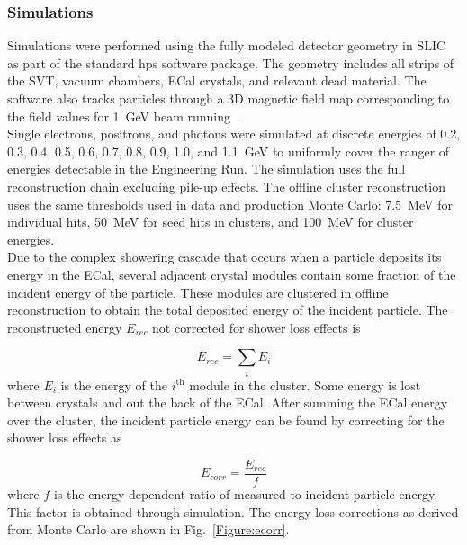 \subsubsection{Simulations}
Simulations were performed using the fully modeled detector geometry in SLIC as part of the standard hps software package. The geometry includes all strips of the SVT, vacuum chambers, ECal crystals, and relevant dead material. The software also tracks particles through a 3D magnetic field map corresponding to the field values for 1~GeV beam running~\cite{szumila-vance_hps_2016}.\\
\indent Single electrons, positrons, and photons were simulated at discrete energies of 0.2, 0.3, 0.4, 0.5, 0.6, 0.7, 0.8,  0.9, 1.0, and 1.1~GeV to uniformly cover the ranger of energies detectable in the Engineering Run. The simulation uses the full reconstruction chain excluding pile-up effects. The offline cluster reconstruction uses the same thresholds used in data and production Monte Carlo: 7.5~MeV for individual hits, 50~MeV for seed hits in clusters, and 100~MeV for cluster energies.\\
\indent Due to the complex showering cascade that occurs when a particle deposits its energy in the ECal, several adjacent crystal modules contain some fraction of the incident energy of the particle. These modules are clustered in offline reconstruction to obtain the total deposited energy of the incident particle. The reconstructed energy $E_{rec}$ not corrected for shower loss effects is 

\begin{equation}
\label{eq:eclsum}
E_{rec} = \sum_i E_i    
\end{equation}
where $E_i$ is the energy of the $i^{\textrm{th}}$ module in the cluster. Some energy is lost between crystals and out the back of the ECal. After summing the ECal energy over the cluster, the incident particle energy can be found by correcting for the shower loss effects as  

\begin{equation}
\label{eq:eclsf}
E_{corr} = \dfrac{E_{rec}}{f}   
\end{equation}
where $f$ is the energy-dependent ratio of measured to incident particle energy. This factor is obtained through simulation. The energy loss corrections as derived from Monte Carlo are shown in Fig.~\ref{Figure:ecorr}.

